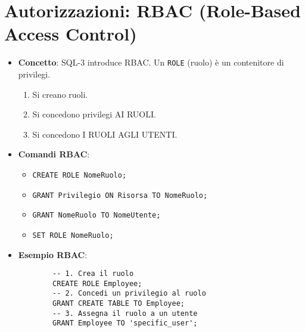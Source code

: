 \documentclass{article}
\begin{document}
	\section{Autorizzazioni: RBAC (Role-Based Access Control)}
	\begin{itemize}
		\item \textbf{Concetto}: SQL-3 introduce RBAC. Un \texttt{ROLE} (ruolo) è un contenitore di privilegi.
		\begin{enumerate}
			\item Si creano ruoli.
			\item Si concedono privilegi AI RUOLI.
			\item Si concedono I RUOLI AGLI UTENTI.
		\end{enumerate}
		\item \textbf{Comandi RBAC}:
		\begin{itemize}
			\item \texttt{CREATE ROLE NomeRuolo;}
			\item \texttt{GRANT Privilegio ON Risorsa TO NomeRuolo;}
			\item \texttt{GRANT NomeRuolo TO NomeUtente;}
			\item \texttt{SET ROLE NomeRuolo;}
		\end{itemize}
		\item \textbf{Esempio RBAC}:
		\begin{verbatim}
		-- 1. Crea il ruolo
		CREATE ROLE Employee;
		-- 2. Concedi un privilegio al ruolo
		GRANT CREATE TABLE TO Employee;
		-- 3. Assegna il ruolo a un utente
		GRANT Employee TO 'specific_user';
		\end{verbatim}
	\end{itemize}
	
\end{document}
